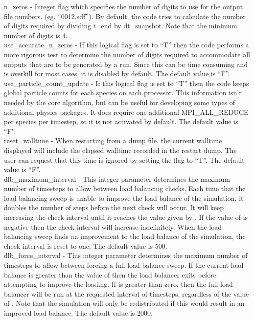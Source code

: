 {\emphtext n\_zeros} - Integer flag which specifies the number of digits to
  use for the output file numbers.
  (eg. ``0012.sdf''). By default, the code tries to calculate the number of
  digits required by dividing t\_end by dt\_snapshot. Note that the minimum
  number of digits is 4.\\

{\emphtext use\_accurate\_n\_zeros} - If this logical flag is set to
  ``T'' then the code performs a more rigorous test to determine the number of
  digits required to accommodate all outputs that are to be generated by a run.
  Since this can be time consuming and is overkill for most cases, it is
  disabled by default.
  The default value is ``F''.\\

{\emphtext use\_particle\_count\_update} - If this logical flag is set to
  ``T'' then the code keeps global particle counts for each species on each
  processor. This information isn't needed by the core
  algorithm, but can be useful for developing some types of additional physics
  packages. It does require one additional MPI\_ALL\_REDUCE per species per
  timestep, so it is not activated by default.
  The default value is ``F''.\\

{\emphtext reset\_walltime} - When restarting from a dump file, the current
  walltime displayed will include the elapsed walltime recorded in the
  restart dump. The user can request that this time is ignored by setting
  the  flag to ``T''.
  The default value is ``F''.\\

{\emphtext dlb\_maximum\_interval} - This integer parameter determines the
  maximum number of timesteps to allow between load balancing checks.
  Each time that the load balancing sweep is unable to improve the load
  balance of the simulation, it doubles the number of steps before the
  next check will occur. It will keep increasing the check interval until
  it reaches the value given by . If the
  value of  is negative then the check
  interval will increase
  indefinitely. When the load balancing sweep finds an improvement to the
  load balance of the simulation, the check interval is reset to one.
  The default value is 500.\\

{\emphtext dlb\_force\_interval} - This integer parameter determines the
  maximum number of timesteps
  to allow between forcing a full load balance sweep.
  If the current load balance is greater than the value of
  then the load balancer exits before attempting to improve the loading.
  If  is greater than zero, then the full load
  balancer will be run at the requested interval of timesteps, regardless
  of the value of . Note that the simulation will
  only be redistributed if this would result in an improved load balance.
  The default value is 2000.\\

